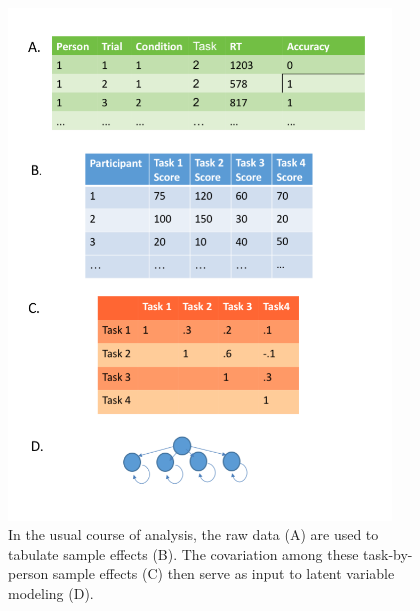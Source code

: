 \documentclass[
  english,
  ,man]{apa6}
\begin{document}
\begin{figure}
\includegraphics[width=4in]{dataAnalysis2} \caption{In the usual course of analysis, the raw data (A) are used to tabulate sample effects (B).  The covariation among these task-by-person sample effects (C) then serve as input to latent variable modeling (D).}\label{fig:usual}
\end{figure}
\end{document}
